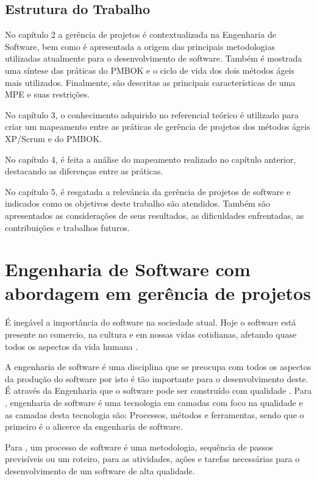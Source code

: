 \documentclass[
    12pt,               %
    openright,          %
    twoside,            %
    a4paper,            %
    chapter=TITLE,     %
    english,            %
    spanish,            %
    portuguese              %
    ]{abntex2}
\begin{document}
\section{Estrutura do Trabalho}

No capítulo 2 a gerência de projetos  é contextualizada na Engenharia de Software, bem como é apresentada a origem das principais metodologias utilizadas atualmente para o desenvolvimento de software. Também é mostrada uma síntese das práticas do PMBOK e o ciclo de vida dos dois métodos ágeis mais utilizados. Finalmente, são descritas as principais características de uma MPE e suas restrições.

No capítulo 3, o conhecimento adquirido no referencial teórico é utilizado para criar um mapeamento entre as práticas de gerência de projetos dos métodos ágeis XP/Scrum e do PMBOK.

No capítulo 4, é feita a análise do mapeamento realizado no capítulo anterior, destacando as diferenças entre as práticas.

No capítulo 5, é resgatada a relevância da gerência de projetos de software e indicados como os objetivos deste trabalho são atendidos. Também são apresentados as considerações de seus resultados, as dificuldades enfrentadas, as contribuições e trabalhos futuros.

\chapter{Engenharia de Software com abordagem em gerência de projetos}

É inegável a importância do software na sociedade atual. Hoje o software está presente no comercio, na cultura e em nossas vidas cotidianas, afetando quase todos os aspectos da vida humana \cite[p.~29]{pressman2011}.

A engenharia de software é uma disciplina que se preocupa com todos os aspectos da produção do software por isto é tão importante para o desenvolvimento deste. É através da Engenharia que o software pode ser construído com qualidade \cite[p.~3]{sommerville2011}. Para , engenharia de software é uma tecnologia em camadas com foco na qualidade e as camadas desta tecnologia são: Processos, métodos e ferramentas, sendo que o primeiro é o alicerce da engenharia de software.

Para , um processo de software é uma metodologia, sequência de passos previsíveis ou um roteiro, para as atividades, ações e tarefas necessárias para o desenvolvimento de um software de alta qualidade. 
\end{document}
